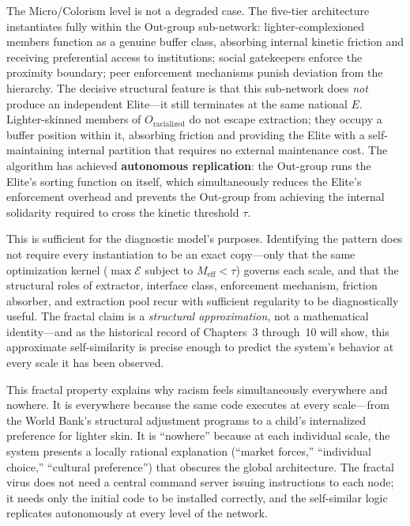 The Micro/Colorism level is not a degraded case. The five-tier architecture instantiates fully within the Out-group sub-network: lighter-complexioned members function as a genuine buffer class, absorbing internal kinetic friction and receiving preferential access to institutions; social gatekeepers enforce the proximity boundary; peer enforcement mechanisms punish deviation from the hierarchy. The decisive structural feature is that this sub-network does \textit{not} produce an independent Elite---it still terminates at the same national $E$. Lighter-skinned members of $O_{\text{racialized}}$ do not escape extraction; they occupy a buffer position within it, absorbing friction and providing the Elite with a self-maintaining internal partition that requires no external maintenance cost. The algorithm has achieved \textbf{autonomous replication}: the Out-group runs the Elite's sorting function on itself, which simultaneously reduces the Elite's enforcement overhead and prevents the Out-group from achieving the internal solidarity required to cross the kinetic threshold $\tau$.

This is sufficient for the diagnostic model's purposes. Identifying the pattern does not require every instantiation to be an exact copy---only that the same optimization kernel ($\max\mathcal{E}$ subject to $M_{\text{eff}}<\tau$) governs each scale, and that the structural roles of extractor, interface class, enforcement mechanism, friction absorber, and extraction pool recur with sufficient regularity to be diagnostically useful. The fractal claim is a \textit{structural approximation}, not a mathematical identity---and as the historical record of Chapters~3 through~10 will show, this approximate self-similarity is precise enough to predict the system's behavior at every scale it has been observed.

This fractal property explains why racism feels simultaneously everywhere and nowhere. It is everywhere because the same code executes at every scale---from the World Bank's structural adjustment programs to a child's internalized preference for lighter skin. It is ``nowhere'' because at each individual scale, the system presents a locally rational explanation (``market forces,'' ``individual choice,'' ``cultural preference'') that obscures the global architecture. The fractal virus does not need a central command server issuing instructions to each node; it needs only the initial code to be installed correctly, and the self-similar logic replicates autonomously at every level of the network.


